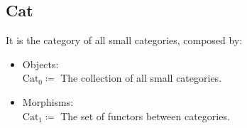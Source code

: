 \subsection{Cat}
\begin{definition}
  It is the category of all small categories, composed by:
  \parencite{adamek_herrlich_strecker:joy_cats}
  \begin{itemize}
    \item Objects:\\
      $\mathrm{Cat}_0 \coloneqq$ The collection of all small categories.
    \item Morphisms:\\
      $\mathrm{Cat}_1 \coloneqq$ The set of functors between categories.
  \end{itemize}
\end{definition}

